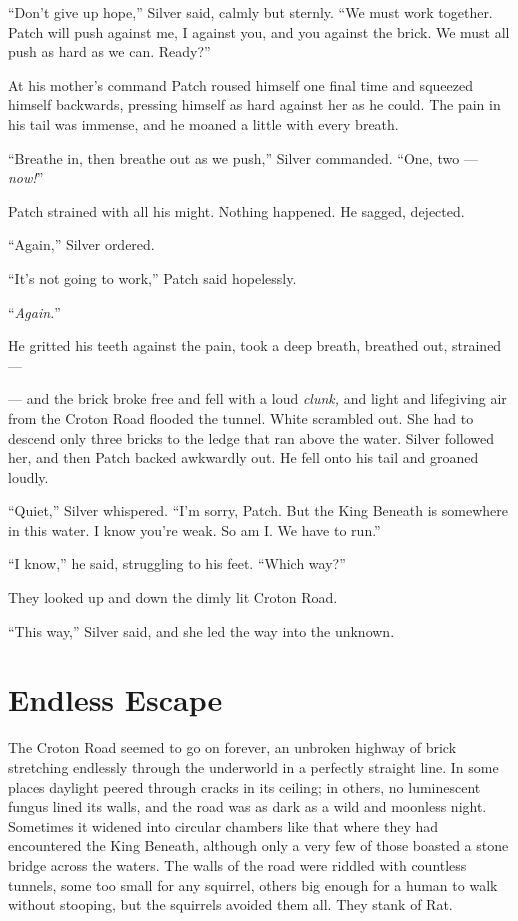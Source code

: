 \documentclass[ebook,oneside,openany,17pt]{memoir}
\renewcommand{\thechapter}{\Roman{chapter}}
\newcounter{sections}
\newcommand{\sections}[1]{%
  \section*{#1}
  \addtocounter{sections}{1}%
  \pdfbookmark[1]{#1}{section.\thechapter.\thesections}}
\begin{document}
“Don’t give up hope,” Silver said, calmly but sternly. “We must work
together. Patch will push against me, I against you, and you against
the brick. We must all push as hard as we can. Ready?”

At his mother’s command Patch roused himself one final time and
squeezed himself backwards, pressing himself as hard against her as he
could. The pain in his tail was immense, and he moaned a little with
every breath.

“Breathe in, then breathe out as we push,” Silver commanded. “One, two
— \emph{now!}”

Patch strained with all his might. Nothing happened. He sagged,
dejected.

“Again,” Silver ordered.

“It’s not going to work,” Patch said hopelessly.

“\emph{Again.}”

He gritted his teeth against the pain, took a deep breath, breathed
out, strained —

— and the brick broke free and fell with a loud \emph{clunk,} and
light and lifegiving air from the Croton Road flooded the
tunnel. White scrambled out. She had to descend only three bricks to
the ledge that ran above the water. Silver followed her, and then
Patch backed awkwardly out. He fell onto his tail and groaned loudly.

“Quiet,” Silver whispered. “I’m sorry, Patch. But the King Beneath is
somewhere in this water. I know you’re weak. So am I. We have to run.”

“I know,” he said, struggling to his feet. “Which way?”

They looked up and down the dimly lit Croton Road.

“This way,” Silver said, and she led the way into the unknown.


\sections{Endless Escape}

The Croton Road seemed to go on forever, an unbroken highway of brick
stretching endlessly through the underworld in a perfectly straight
line. In some places daylight peered through cracks in its ceiling; in
others, no luminescent fungus lined its walls, and the road was as
dark as a wild and moonless night. Sometimes it widened into circular
chambers like that where they had encountered the King Beneath,
although only a very few of those boasted a stone bridge across the
waters. The walls of the road were riddled with countless tunnels,
some too small for any squirrel, others big enough for a human to walk
without stooping, but the squirrels avoided them all. They stank of
Rat.
\end{document}
